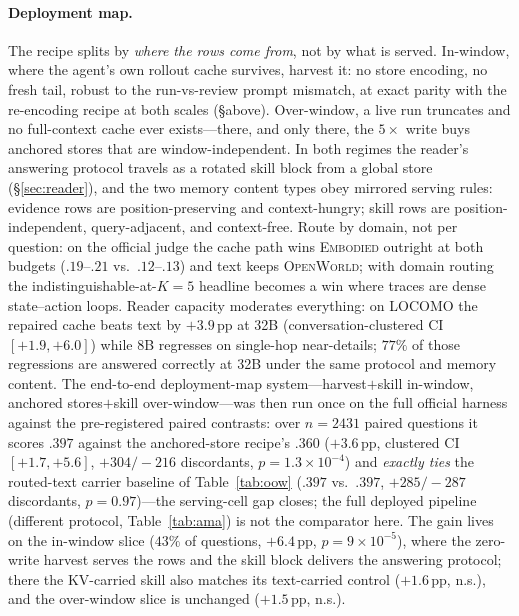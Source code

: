 \documentclass{article} %
\newcommand{\pp}{\,\mathrm{pp}}
\begin{document}
\paragraph{Deployment map.} The recipe splits by \emph{where the rows come from}, not by
what is served. In-window, where the agent's own rollout cache survives, harvest it: no
store encoding, no fresh tail, robust to the run-vs-review prompt mismatch, at exact
parity with the re-encoding recipe at both scales (\S above). Over-window, a live run
truncates and no full-context cache ever exists---there, and only there, the $5\times$
write buys anchored stores that are window-independent. In both regimes the reader's
answering protocol travels as a rotated skill block from a global store
(\S\ref{sec:reader}), and the two memory content types obey mirrored serving rules:
evidence rows are position-preserving and context-hungry; skill rows are
position-independent, query-adjacent, and context-free. Route by domain, not per
question: on the official judge the
cache path wins \textsc{Embodied} outright at both budgets ($.19$--$.21$ vs.\
$.12$--$.13$) and text keeps \textsc{OpenWorld}; with domain routing the
indistinguishable-at-$K{=}5$ headline becomes a win where traces are dense
state--action loops. Reader capacity
moderates everything: on LOCOMO the repaired cache beats text by $+3.9\pp$ at 32B
(conversation-clustered CI $[+1.9,+6.0]$) while 8B regresses on single-hop near-details;
$77\%$ of those regressions are answered correctly at 32B under the same protocol and
memory content. The end-to-end deployment-map system---harvest$+$skill in-window,
anchored stores$+$skill over-window---was then run once on the full official harness
against the pre-registered paired contrasts: over $n{=}2431$ paired questions it scores
$.397$ against the anchored-store recipe's $.360$ ($+3.6\pp$, clustered CI $[+1.7,+5.6]$,
$+304/{-}216$ discordants, $p{=}1.3{\times}10^{-4}$) and \emph{exactly ties} the
routed-text carrier baseline of Table~\ref{tab:oow} ($.397$ vs.\ $.397$, $+285/{-}287$
discordants, $p{=}0.97$)---the serving-cell gap closes; the full deployed pipeline
(different protocol, Table~\ref{tab:ama}) is not the comparator here. The gain lives on the in-window slice ($43\%$ of
questions, $+6.4\pp$, $p{=}9{\times}10^{-5}$), where the zero-write harvest serves the
rows and the skill block delivers the answering protocol; there the KV-carried skill
also matches its text-carried control ($+1.6\pp$, n.s.), and the over-window slice is
unchanged ($+1.5\pp$, n.s.).
\end{document}
